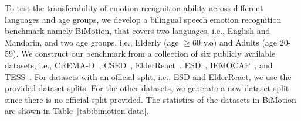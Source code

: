 \documentclass{INTERSPEECH2023}
\begin{document}
\begin{table}[!t]
    \caption{Statistics of datasets covered in BiMotion.}
    \label{tab:bimotion-data}
    \centering
\end{table}

To test the transferability of emotion recognition ability across different languages and age groups, we develop a bilingual speech emotion recognition benchmark namely BiMotion, that covers two languages, i.e., English and Mandarin, and two age groups, i.e., Elderly (age $\geq$60 y.o) and Adults (age 20-59). We construct our benchmark from a collection of six publicly available datasets, i.e., CREMA-D~\cite{cao2014crema}, CSED~\cite{lee2017csed}, ElderReact~\cite{ma2019elderreact}, ESD~\cite{zhou2022esd}, IEMOCAP~\cite{busso2008iemocap}, and TESS~\cite{pichora2020tess}. For datasets with an official split, i.e., ESD and ElderReact, we use the provided dataset splits. For the other datasets, we generate a new dataset split since there is no official split provided. The statistics of the datasets in BiMotion are shown in Table~\ref{tab:bimotion-data}.
\end{document}
